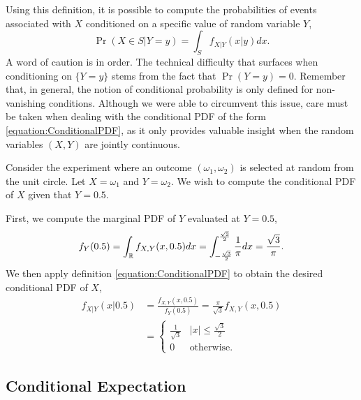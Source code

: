 Using this definition, it is possible to compute the probabilities of events associated with $X$ conditioned on a specific value of random variable $Y$,
\begin{equation*}
\Pr (X \in S | Y = y) = \int_S f_{X|Y} (x|y) dx .
\end{equation*}
A word of caution is in order.
The technical difficulty that surfaces when conditioning on $\{ Y = y \}$ stems from the fact that $\Pr (Y = y) = 0$.
Remember that, in general, the notion of conditional probability is only defined for non-vanishing conditions.
Although we were able to circumvent this issue, care must be taken when dealing with the conditional PDF of the form \eqref{equation:ConditionalPDF}, as it only provides valuable insight when the random variables $(X, Y)$ are jointly continuous.

\begin{example}
Consider the experiment where an outcome $(\omega_1, \omega_2)$ is selected at random from the unit circle.
Let $X = \omega_1$ and $Y = \omega_2$.
We wish to compute the conditional PDF of $X$ given that $Y = 0.5$.

First, we compute the marginal PDF of $Y$ evaluated at $Y = 0.5$,
\begin{equation*}
f_Y (0.5) = \int_{\mathbb{R}} f_{X,Y} (x, 0.5) dx
= \int_{-\frac{\sqrt{3}}{2}}^{\frac{\sqrt{3}}{2}} \frac{1}{\pi} dx
= \frac{\sqrt{3}}{\pi} .
\end{equation*}
We then apply definition \eqref{equation:ConditionalPDF} to obtain the desired conditional PDF of $X$,
\begin{equation*}
\begin{split}
f_{X|Y} ( x | 0.5 ) &= \frac{f_{X,Y} (x, 0.5)}{f_{Y} ( 0.5 ) }
= \frac{\pi}{\sqrt{3}} f_{X,Y} (x, 0.5) \\
&= \begin{cases} \frac{1}{\sqrt{3}} & |x| \leq \frac{\sqrt{3}}{2} \\
0 & \text{otherwise} . \end{cases}
\end{split}
\end{equation*}
\end{example}


\subsection{Conditional Expectation}


